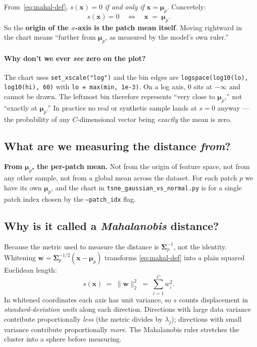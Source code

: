 \documentclass[11pt]{article}
\newcommand{\code}[1]{\texttt{#1}}
\newcommand{\bmu}{\boldsymbol{\mu}}
\newcommand{\bSigma}{\boldsymbol{\Sigma}}
\begin{document}
From~\eqref{eq:mahal-def}, $s(\mathbf{x}) = 0$ \emph{if and only if}
$\mathbf{x} = \bmu_p$. Concretely:
\begin{equation}
  s(\mathbf{x}) = 0 \quad\Longleftrightarrow\quad \mathbf{x} \;=\; \bmu_p.
\end{equation}
So the \textbf{origin of the $x$-axis is the patch mean itself}. Moving rightward
in the chart means ``further from $\bmu_p$, as measured by the model's own ruler.''

\paragraph{Why don't we ever \emph{see} zero on the plot?}
The chart uses \code{set\_xscale("log")} and the bin edges are
\code{logspace(log10(lo), log10(hi), 60)} with \code{lo = max(min, 1e-3)}. On a
log axis, $0$ sits at $-\infty$ and cannot be drawn. The leftmost bin therefore
represents ``very close to $\bmu_p$,'' not ``exactly at $\bmu_p$.'' In practice
no real or synthetic sample lands at $s = 0$ anyway --- the probability of any
$C$-dimensional vector being \emph{exactly} the mean is zero.

\subsection{What are we measuring the distance \emph{from}?}

\textbf{From $\bmu_p$, the per-patch mean.} Not from the origin of feature
space, not from any other sample, not from a global mean across the dataset.
For each patch $p$ we have its own $\bmu_p$, and the chart in
\code{tsne\_gaussian\_vs\_normal.py} is for a single patch index chosen by the
\code{--patch\_idx} flag.

\subsection{Why is it called a \emph{Mahalanobis} distance?}

Because the metric used to measure the distance is $\bSigma_p^{-1}$, not the
identity. Whitening
$\mathbf{w} = \bSigma_p^{-1/2}(\mathbf{x} - \bmu_p)$ transforms
\eqref{eq:mahal-def} into a plain squared Euclidean length:
\begin{equation}
  s(\mathbf{x}) \;=\; \lVert \mathbf{w} \rVert_2^2 \;=\; \sum_{i=1}^{C} w_i^2.
\end{equation}
In whitened coordinates each axis has unit variance, so $s$ counts displacement
in \emph{standard-deviation units} along each direction. Directions with large
data variance contribute proportionally \emph{less} (the metric divides by
$\lambda_j$); directions with small variance contribute proportionally
\emph{more}. The Mahalanobis ruler stretches the cluster into a sphere before
measuring.
\end{document}
